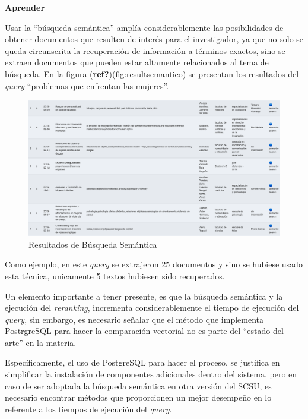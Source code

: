 \documentclass[
  12pt,
  openany]{book}
\begin{document}
\textbf{Aprender}

Usar la ``búsqueda semántica'' amplía considerablemente las posibilidades de obtener documentos que resulten de interés para el investigador, ya que no solo se queda circunscrita la recuperación de información a términos exactos, sino se extraen documentos que pueden estar altamente relacionados al tema de búsqueda. En la figura (\protect\hyperlink{ref-ref}{\textbf{ref?}})(fig:resultsemantico) se presentan los resultados del \emph{query} ``problemas que enfrentan las mujeres''.

\begin{figure}

{\centering \includegraphics[width=0.95\linewidth]{images/05-desarrollo/5_ciclo/resultsemantico} 

}

\caption{Resultados de Búsqueda Semántica}\label{fig:resultsemantico}
\end{figure}

Como ejemplo, en este \emph{query} se extrajeron 25 documentos y sino se hubiese usado esta técnica, unicamente 5 textos hubiesen sido recuperados.

Un elemento importante a tener presente, es que la búsqueda semántica y la ejecución del \emph{reranking}, incrementa considerablemente el tiempo de ejecución del \emph{query}, sin embargo, es necesario señalar que el método que implementa PostrgreSQL para hacer la comparación vectorial no es parte del ``estado del arte'' en la materia.

Específicamente, el uso de PostgreSQL para hacer el proceso, se justifica en simplificar la instalación de componentes adicionales dentro del sistema, pero en caso de ser adoptada la búsqueda semántica en otra versión del SCSU, es necesario encontrar métodos que proporcionen un mejor desempeño en lo referente a los tiempos de ejecución del \emph{query}.
\end{document}
